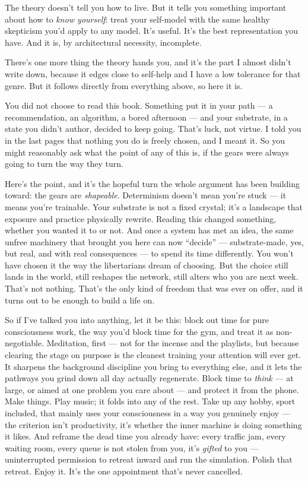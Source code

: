 \documentclass[11pt, twoside, openright]{book}
\begin{document}
The theory doesn't tell you how to live. But it tells you something important about how to \textit{know yourself}: treat your self-model with the same healthy skepticism you'd apply to any model. It's useful. It's the best representation you have. And it is, by architectural necessity, incomplete.

There's one more thing the theory hands you, and it's the part I almost didn't write down, because it edges close to self-help and I have a low tolerance for that genre. But it follows directly from everything above, so here it is.

You did not choose to read this book. Something put it in your path --- a recommendation, an algorithm, a bored afternoon --- and your substrate, in a state you didn't author, decided to keep going. That's luck, not virtue. I told you in the last pages that nothing you do is freely chosen, and I meant it. So you might reasonably ask what the point of any of this is, if the gears were always going to turn the way they turn.

Here's the point, and it's the hopeful turn the whole argument has been building toward: the gears are \textit{shapeable}. Determinism doesn't mean you're stuck --- it means you're trainable. Your substrate is not a fixed crystal; it's a landscape that exposure and practice physically rewrite. Reading this changed something, whether you wanted it to or not. And once a system has met an idea, the same unfree machinery that brought you here can now ``decide'' --- substrate-made, yes, but real, and with real consequences --- to spend its time differently. You won't have chosen it the way the libertarians dream of choosing. But the choice still lands in the world, still reshapes the network, still alters who you are next week. That's not nothing. That's the only kind of freedom that was ever on offer, and it turns out to be enough to build a life on.

So if I've talked you into anything, let it be this: block out time for pure consciousness work, the way you'd block time for the gym, and treat it as non-negotiable. Meditation, first --- not for the incense and the playlists, but because clearing the stage on purpose is the cleanest training your attention will ever get. It sharpens the background discipline you bring to everything else, and it lets the pathways you grind down all day actually regenerate. Block time to \textit{think} --- at large, or aimed at one problem you care about --- and protect it from the phone. Make things. Play music; it folds into any of the rest. Take up any hobby, sport included, that mainly uses your consciousness in a way you genuinely enjoy --- the criterion isn't productivity, it's whether the inner machine is doing something it likes. And reframe the dead time you already have: every traffic jam, every waiting room, every queue is not stolen from you, it's \textit{gifted} to you --- uninterrupted permission to retreat inward and run the simulation. Polish that retreat. Enjoy it. It's the one appointment that's never cancelled.
\end{document}
